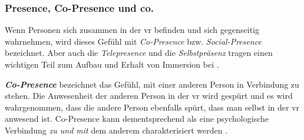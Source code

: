\documentclass[a4paper,11pt]{article}%
\renewcommand{\\}{\vspace*{0.5\baselineskip} \newline}
\begin{document}
%			
			


		\subsubsection{Presence, Co-Presence und co.}
Wenn Personen sich zusammen in der \ac{vr} befinden und sich gegenseitig wahrnehmen, wird dieses Gefühl mit \textit{Co-Presence} bzw. \textit{Social-Presence} bezeichnet. Aber auch die \textit{Telepresence} und die \textit{Selbstpräsenz} tragen einen wichtigen Teil zum Aufbau und Erhalt von Immersion bei \citep{schuemie2001research}.

\textbf{\textit{Co-Presence}} bezeichnet das Gefühl, mit einer anderen Person in Verbindung zu stehen.
Die Anwesenheit der anderen Person in der \ac{vr} wird gespürt und es wird wahrgenommen, dass die andere Person ebenfalls spürt, dass man selbst in der \ac{vr} anwesend ist. 
Co-Presence kann dementsprechend als eine psychologische Verbindung \textit{zu und mit} dem anderem charakterisiert werden \citep[179-182]{ijsselsteijn2001presence}.
\end{document}
